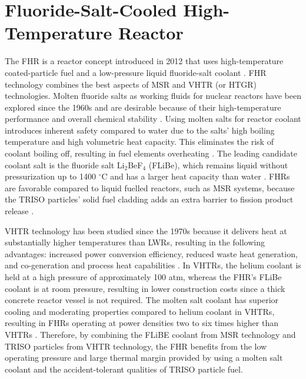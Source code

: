 \section{Fluoride-Salt-Cooled High-Temperature Reactor}
\label{sec:fhr}
The \gls{FHR} is a reactor concept introduced in 2012 that uses high-temperature 
coated-particle fuel and a low-pressure liquid fluoride-salt coolant 
\cite{forsberg_fluoride-salt-cooled_2012,facilitators_fluoride-salt-cooled_2013}.
\gls{FHR} technology combines the best aspects of \gls{MSR} and \gls{VHTR} 
(or \gls{HTGR}) technologies. 
Molten fluoride salts as working fluids for nuclear reactors have been explored 
since the 1960s and are desirable because of their high-temperature 
performance and overall chemical stability \cite{scarlat_design_2014}.  
Using molten salts for reactor coolant introduces inherent safety compared 
to water due to the salts' high boiling temperature and high volumetric 
heat capacity.
This eliminates the risk of coolant boiling off, resulting in fuel elements 
overheating \cite{ho_molten_2013}. 
The leading candidate coolant salt is the fluoride salt Li$_2$BeF$_4$ (FLiBe), 
which remains liquid without pressurization up to 1400 $^{\circ}$C and has a larger 
heat capacity than water \cite{ho_molten_2013,forsberg_fluoride-salt-cooled_2012}. 
\glspl{FHR} are favorable compared to liquid fuelled reactors, such as
\gls{MSR} systems, because the \gls{TRISO} particles' solid fuel cladding adds 
an extra barrier to fission product release \cite{ho_molten_2013}.

\gls{VHTR} technology has been studied since the 1970s because it delivers 
heat at substantially higher temperatures than \glspl{LWR}, resulting in 
the following advantages: increased power conversion efficiency, reduced 
waste heat generation, and co-generation and process heat capabilities 
\cite{scarlat_design_2014}. 
In \glspl{VHTR}, the helium coolant is held at a high pressure of approximately 
100 atm, whereas the \gls{FHR}'s FLiBe coolant is at room pressure, resulting in lower 
construction costs since a thick concrete reactor vessel is not required.
The molten salt coolant has superior cooling and moderating properties compared 
to helium coolant in \glspl{VHTR}, resulting in \glspl{FHR} operating at 
power densities two to six times higher than  \glspl{VHTR} 
\cite{scarlat_design_2014,forsberg_fluoride-salt-cooled_2012}.
Therefore, by combining the FLiBE coolant from \gls{MSR} technology and 
\gls{TRISO} particles from \gls{VHTR} technology, the \gls{FHR} benefits from 
the low operating pressure and large thermal margin provided by using a molten 
salt coolant and the accident-tolerant qualities of \gls{TRISO} particle fuel. 

